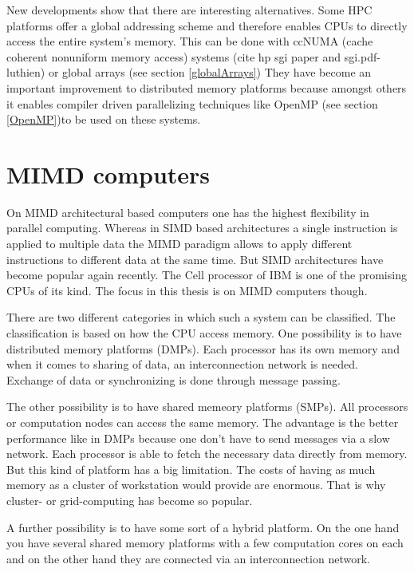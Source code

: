 New developments show that there are interesting alternatives. Some
HPC platforms offer a global addressing scheme and therefore enables
CPUs to directly access the entire system's memory. This can be done
with ccNUMA (cache coherent nonuniform memory access) systems (cite hp
sgi paper and sgi.pdf-luthien) or
global arrays (see section \ref{globalArrays})
They have become an important improvement to distributed memory
platforms because amongst others it enables compiler driven
parallelizing techniques like OpenMP (see section \ref{OpenMP})to be
used on these systems. 

\section{MIMD computers}
\label{sec:mimd_computers}

On MIMD architectural based computers one has the highest flexibility
in parallel computing. Whereas in SIMD based architectures a single
instruction is applied to multiple data the MIMD paradigm allows to
apply different instructions to different data at the same time. But
SIMD architectures have become popular again recently. The Cell
processor of IBM is one of the promising CPUs of its kind. The focus in
this thesis is on MIMD computers though.

There are two different categories in which such a system can be
classified. The classification is based on how the CPU access
memory. One possibility is to have distributed memory platforms (DMPs). Each
processor has its own memory and when it comes to sharing of data, an
interconnection network is needed. Exchange of data or synchronizing
is done through message passing.

The other possibility is to have shared memeory platforms (SMPs). All
processors or computation nodes can access the same memory. The
advantage is the better performance like in DMPs because one don't
have to send messages via a slow network. Each processor is able to
fetch the necessary data directly from memory. But this kind of platform
has a big limitation. The costs of having as much memory as a cluster
of workstation would provide are enormous. That is why cluster- or
grid-computing has become so popular.

A further possibility is to have some sort of a hybrid platform. On
the one hand you have several shared memory platforms with a few
computation cores on each and on the other hand they are connected via
an interconnection network. 

